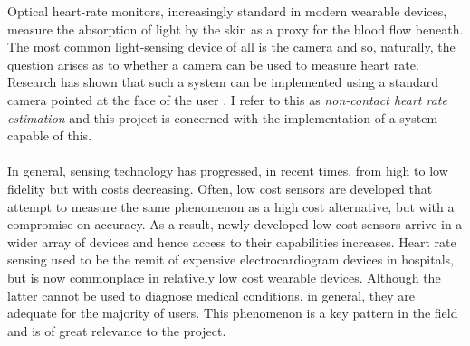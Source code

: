 Optical heart-rate monitors, increasingly standard in modern wearable devices, measure the absorption of light
by the skin as a proxy for the blood flow beneath.
The most common light-sensing device of all is the camera and so, naturally, the question arises as to whether a camera can be used to measure heart rate.
Research has shown that such a system can be implemented using a standard camera pointed at the face of the user \cite{poh2010non}\cite{vanderKooij2019}\cite{Verkruysse2008}. I refer to this as \textit{non-contact heart rate estimation} and this project is concerned with the implementation of a system capable of this.  
\\\\
In general, sensing technology has progressed, in recent times, from high to low fidelity but with costs decreasing.
Often, low cost sensors are developed that attempt to measure the same phenomenon as a high cost alternative, but with a compromise on accuracy.
As a result, newly developed low cost sensors arrive in a wider array of devices and hence access to their capabilities increases.
Heart rate sensing used to be the remit of expensive electrocardiogram devices in hospitals, but is now commonplace in relatively low cost wearable devices. Although the latter cannot be used to diagnose medical conditions, in general, they are adequate for the majority of users. This phenomenon
is a key pattern in the field and is of great relevance to the project.
